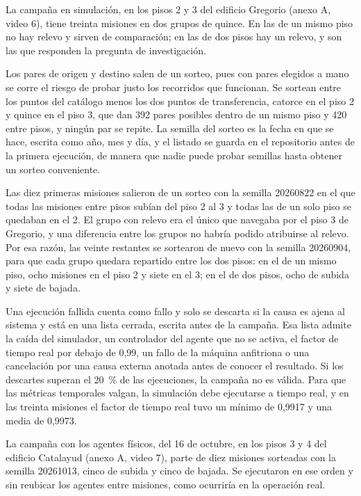 La campaña en simulación, en los pisos 2 y 3 del edificio Gregorio (anexo A, video 6), tiene treinta misiones en dos grupos de quince. En las de un mismo piso no hay relevo y sirven de comparación; en las de dos pisos hay un relevo, y son las que responden la pregunta de investigación.

Los pares de origen y destino salen de un sorteo, pues con pares elegidos a mano se corre el riesgo de probar justo los recorridos que funcionan. Se sortean entre los puntos del catálogo menos los dos puntos de transferencia, catorce en el piso 2 y quince en el piso 3, que dan 392 pares posibles dentro de un mismo piso y 420 entre pisos, y ningún par se repite. La semilla del sorteo es la fecha en que se hace, escrita como año, mes y día, y el listado se guarda en el repositorio antes de la primera ejecución, de manera que nadie puede probar semillas hasta obtener un sorteo conveniente.

Las diez primeras misiones salieron de un sorteo con la semilla 20260822 en el que todas las misiones entre pisos subían del piso 2 al 3 y todas las de un solo piso se quedaban en el 2. El grupo con relevo era el único que navegaba por el piso 3 de Gregorio, y una diferencia entre los grupos no habría podido atribuirse al relevo. Por esa razón, las veinte restantes se sortearon de nuevo con la semilla 20260904, para que cada grupo quedara repartido entre los dos pisos: en el de un mismo piso, ocho misiones en el piso 2 y siete en el 3; en el de dos pisos, ocho de subida y siete de bajada.

Una ejecución fallida cuenta como fallo y solo se descarta si la causa es ajena al sistema y está en una lista cerrada, escrita antes de la campaña. Esa lista admite la caída del simulador, un controlador del agente que no se activa, el factor de tiempo real por debajo de 0,99, un fallo de la máquina anfitriona o una cancelación por una causa externa anotada antes de conocer el resultado. Si los descartes superan el 20~\% de las ejecuciones, la campaña no es válida. Para que las métricas temporales valgan, la simulación debe ejecutarse a tiempo real, y en las treinta misiones el factor de tiempo real tuvo un mínimo de 0,9917 y una media de 0,9973.

La campaña con los agentes físicos, del 16 de octubre, en los pisos 3 y 4 del edificio Catalayud (anexo A, video 7), parte de diez misiones sorteadas con la semilla 20261013, cinco de subida y cinco de bajada. Se ejecutaron en ese orden y sin reubicar los agentes entre misiones, como ocurriría en la operación real.

